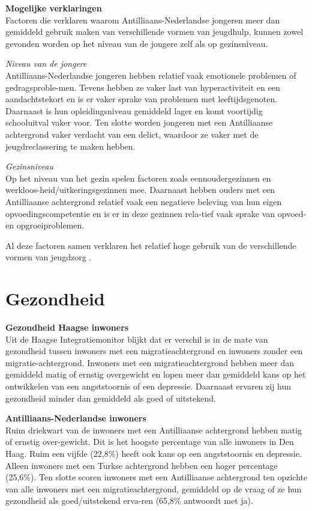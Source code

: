 \documentclass[]{book}
\begin{document}
\textbf{Mogelijke verklaringen}\\
Factoren die verklaren waarom Antilliaans-Nederlandse jongeren meer dan
gemiddeld gebruik maken van verschillende vormen van jeugdhulp, kunnen
zowel gevonden worden op het niveau van de jongere zelf als op
gezinsniveau.

\emph{Niveau van de jongere}\\
Antilliaans-Nederlandse jongeren hebben relatief vaak emotionele
problemen of gedragsproble-men. Tevens hebben ze vaker last van
hyperactiviteit en een aandachtstekort en is er vaker sprake van
problemen met leeftijdsgenoten. Daarnaast is hun opleidingsniveau
gemiddeld lager en komt voortijdig schooluitval vaker voor. Ten slotte
worden jongeren met een Antilliaanse achtergrond vaker verdacht van een
delict, waardoor ze vaker met de jeugdreclassering te maken hebben.

\emph{Gezinsniveau}\\
Op het niveau van het gezin spelen factoren zoals eennoudergezinnen en
werkloos-heid/uitkeringsgezinnen mee. Daarnaast hebben ouders met een
Antilliaanse achtergrond relatief vaak een negatieve beleving van hun
eigen opvoedingscompetentie en is er in deze gezinnen rela-tief vaak
sprake van opvoed- en opgroeiproblemen.

Al deze factoren samen verklaren het relatief hoge gebruik van de
verschillende vormen van jeugdzorg \citep{Gilsing2015}.

\hypertarget{gezondheid}{%
\chapter*{Gezondheid}\label{gezondheid}}

\textbf{Gezondheid Haagse inwoners}\\
Uit de Haagse Integratiemonitor \citep{DeGruijter2014} blijkt dat er
verschil is in de mate van gezondheid tussen inwoners met een
migratieachtergrond en inwoners zonder een migratie-achtergrond.
Inwoners met een migratieachtergrond hebben meer dan gemiddeld matig of
ernstig overgewicht en lopen meer dan gemiddeld kans op het ontwikkelen
van een angststoornis of een depressie. Daarnaast ervaren zij hun
gezondheid minder dan gemiddeld als goed of uitstekend.

\textbf{Antilliaans-Nederlandse inwoners}\\
Ruim driekwart van de inwoners met een Antilliaanse achtergrond hebben
matig of ernstig over-gewicht. Dit is het hoogste percentage van alle
inwoners in Den Haag. Ruim een vijfde (22,8\%) heeft ook kans op een
angststoornis en depressie. Alleen inwoners met een Turkse achtergrond
hebben een hoger percentage (25,6\%). Ten slotte scoren inwoners met een
Antilliaanse achtergrond ten opzichte van alle inwoners met een
migratieachtergrond, gemiddeld op de vraag of ze hun gezondheid als
goed/uitstekend erva-ren (65,8\% antwoordt met ja).
\end{document}
